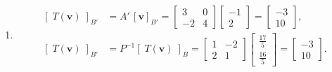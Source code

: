 \documentclass{report}
\begin{document}
{\begin{enumerate}[label=(\alph*)]
        \item      \[
                  \begin{aligned}
                      [\;T(\mathbf{v})\;]_{B'}
                       & =A'\,[\mathbf{v}]_{B'}
                      =\begin{bmatrix}3&0\\-2&4\end{bmatrix}
                      \begin{bmatrix}-1\\2\end{bmatrix}
                      =\begin{bmatrix}-3\\10\end{bmatrix}, \\[6pt]
                      [\;T(\mathbf{v})\;]_{B'}
                       & =P^{-1}[\;T(\mathbf{v})\;]_{B}
                      =\begin{bmatrix}1&-2\\2&1\end{bmatrix}
                      \begin{bmatrix}\tfrac{17}{5}\\[4pt]\tfrac{16}{5}\end{bmatrix}
                      =\begin{bmatrix}-3\\10\end{bmatrix}.
                  \end{aligned}
              \]
    \end{enumerate}
}

\end{document}

